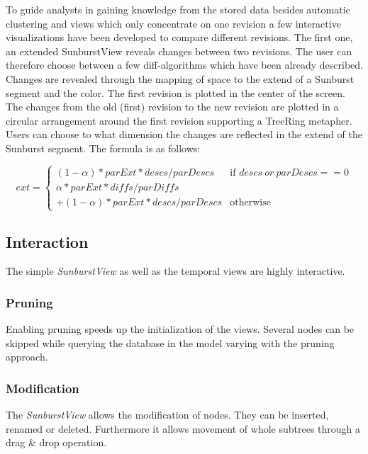 To guide analysts in gaining knowledge from the stored data besides automatic clustering and views which only concentrate on one revision a few interactive visualizations have been developed to compare different revisions. The first one, an extended SunburstView reveals changes between two revisions. The user can therefore choose between a few diff-algorithms which have been already described. Changes are revealed through the mapping of space to the extend of a Sunburst segment and the color. The first revision is plotted in the center of the screen. The changes from the old (first) revision to the new revision are plotted in a circular arrangement around the first revision supporting a TreeRing metapher. Users can choose to what dimension the changes are reflected in the extend of the Sunburst segment. The formula is as follows:

\begin{equation}
ext = \left\{ \begin{array}{cl}
(1-\alpha) * parExt * descs / parDescs & \textrm{if }descs\ or\ parDescs == 0\\
\alpha * parExt * diffs / parDiffs\\
+ (1-\alpha) * parExt * descs / parDescs & \textrm{otherwise}\end{array}\right.
\end{equation}


\subsection{Interaction}
The simple \emph{SunburstView} as well as the temporal views are highly interactive.

\subsubsection{Pruning}
Enabling pruning speeds up the initialization of the views. Several nodes can be skipped while querying the database in the model varying with the pruning approach.

\subsubsection{Modification}
The \emph{SunburstView} allows the modification of nodes. They can be inserted, renamed or deleted. Furthermore it allows movement of whole subtrees through a drag \& drop operation. 

